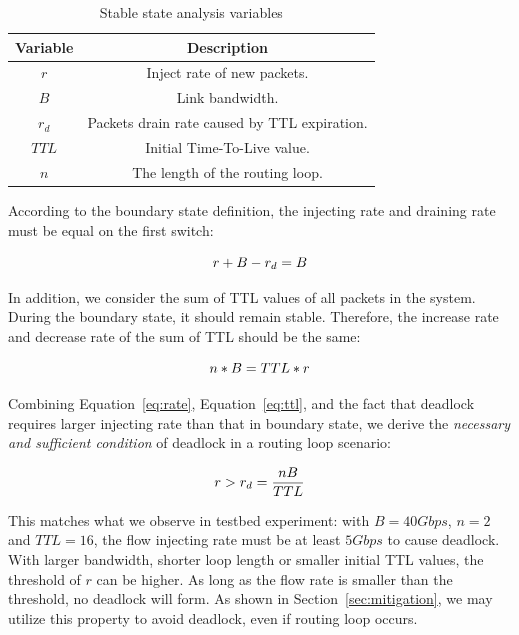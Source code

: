 \begin{table}[h]
\centering
\caption{\small Stable state analysis variables}
\label{tab:stable_state}
{\small
\begin{tabular}{|c|c|}
 \hline
Variable &  Description \\
\hline
$r$ & Inject rate of new packets. \\
\hline
$B$ & Link bandwidth. \\
\hline
$r_d$ & Packets drain rate caused by TTL expiration. \\
\hline
$TTL$ & Initial Time-To-Live value. \\
\hline
$n$ & The length of the routing loop. \\
\hline
\end{tabular}
}
\end{table}

According to the boundary state definition, the injecting rate and draining rate
must be equal on the first switch:

\begin{equation}
\small
r + B - r_d = B
\label{eq:rate}
\end{equation}

In addition, we consider the sum of TTL values of all packets in the system. 
During the boundary state, it should remain stable. Therefore, the increase
rate and decrease rate of the sum of TTL should be the same:

\begin{equation}
\small
n * B = TTL * r
\label{eq:ttl}
\end{equation}

Combining Equation~\ref{eq:rate}, Equation~\ref{eq:ttl}, and the fact that
deadlock requires larger injecting rate than that in boundary state, we derive the 
{\em necessary and sufficient condition} of deadlock in a routing loop scenario:

\begin{equation}
\small
r > r_d = \frac{nB}{TTL}
\label{eq:condition}
\end{equation}

This matches what we observe in testbed experiment: with $B=40Gbps$, $n=2$ and
$TTL=16$, the flow injecting rate must be at least $5Gbps$ to cause deadlock. With larger bandwidth,
shorter loop length or smaller initial TTL values, the threshold of $r$ can be higher.
As long as the flow rate is smaller than the threshold, no deadlock will form.
As shown in Section~\ref{sec:mitigation}, we may utilize this property to avoid deadlock, 
even if routing loop occurs. 

